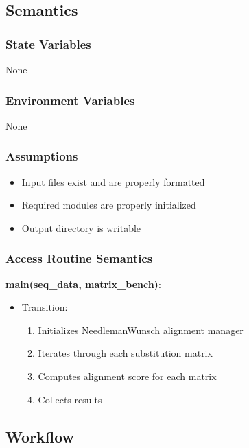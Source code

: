 \documentclass[12pt, titlepage]{article}
\begin{document}
\subsection{Semantics}

\subsubsection{State Variables}

None

\subsubsection{Environment Variables}

None

\subsubsection{Assumptions}

\begin{itemize}
    \item Input files exist and are properly formatted
    \item Required modules are properly initialized
    \item Output directory is writable
\end{itemize}

\subsubsection{Access Routine Semantics}

\noindent \textbf{main(seq\_data, matrix\_bench)}:
\begin{itemize}
    \item Transition:
    \begin{enumerate}
        \item Initializes NeedlemanWunsch alignment manager
        \item Iterates through each substitution matrix
        \item Computes alignment score for each matrix
        \item Collects results
    \end{enumerate}
\end{itemize}

\subsection{Workflow}
\end{document}
